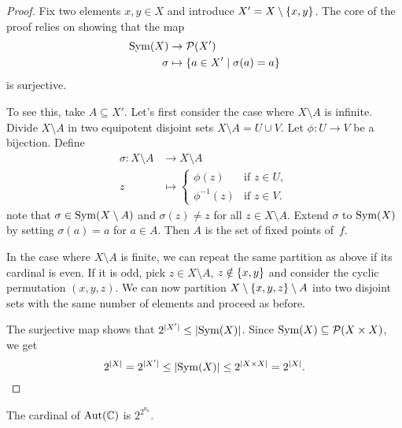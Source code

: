 \begin{proof}
    Fix two elements $x,y\in X$ and introduce $X'=X\setminus\{x,y\}$. The core of the proof relies on showing that the map
    \begin{align*}
        {\rm Sym}(X)&\to\mathcal P(X')\\
        \sigma&\mapsto\{a\in X'\mid\sigma(a)=a\}
    \end{align*}
    is surjective.

    To see this, take $A\subseteq X'$. Let's first consider the case where $X\setminus A$ is infinite. Divide $X\setminus A$ in two equipotent disjoint sets $X\setminus A=U\cup V$. Let $\phi\colon U\to V$ be a bijection. Define
    \begin{align*}
        \sigma\colon X\setminus A&\to X\setminus A\\
            z&\mapsto\begin{cases}
                \phi(z) &\text{if }z\in U,\\
                \phi^{-1}(z)    &\text{if } z\in V.
            \end{cases}
    \end{align*}
    note that $\sigma\in{\rm Sym}(X\setminus A)$ and $\sigma(z)\ne z$ for all $z\in X\setminus A$. Extend $\sigma$ to ${\rm Sym}(X)$ by setting $\sigma(a)=a$ for $a\in A$. Then $A$ is the set of fixed points of~$f$.

    In the case where $X\setminus A$ is finite, we can repeat the same partition as above if its cardinal is even. If it is odd, pick $z\in X\setminus A$, $z\notin\{x,y\}$ and consider the cyclic permutation $(x, y, z)$. We can now partition $X\setminus\{x,y,z\}\setminus A$ into two disjoint sets with the same number of elements and proceed as before.
    
    The surjective map shows that $2^{|X'|}\le|{\rm Sym}(X)|$. Since ${\rm Sym}(X)\subseteq\mathcal P(X\times X)$, we get
    $$
        2^{|X|} = 2^{|X'|} \le |{\rm Sym}(X)|\le2^{|X\times X|}=2^{|X|}.
    $$
\end{proof}

\begin{cor}
    The cardinal of\/ ${\rm Aut}(\mathbb{C})$ is\/ $2^{2^{\aleph_0}}$.
\end{cor}

